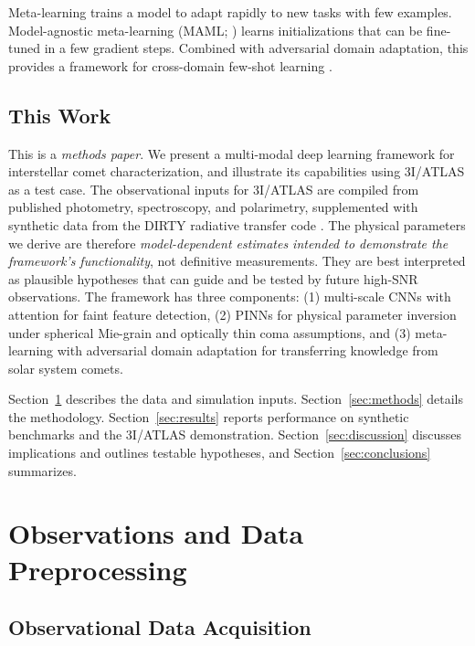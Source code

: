 \documentclass[preprint2]{aastex631}
\begin{document}
Meta-learning trains a model to adapt rapidly to new tasks with few examples. Model-agnostic meta-learning (MAML; \citealt{finn17}) learns initializations that can be fine-tuned in a few gradient steps. Combined with adversarial domain adaptation, this provides a framework for cross-domain few-shot learning \citep{li18}.

\subsection{This Work}

This is a \textit{methods paper}. We present a multi-modal deep learning framework for interstellar comet characterization, and illustrate its capabilities using 3I/ATLAS as a test case. The observational inputs for 3I/ATLAS are compiled from published photometry, spectroscopy, and polarimetry, supplemented with synthetic data from the DIRTY radiative transfer code \citep{gordon01}. The physical parameters we derive are therefore \textit{model-dependent estimates intended to demonstrate the framework's functionality}, not definitive measurements. They are best interpreted as plausible hypotheses that can guide and be tested by future high-SNR observations. The framework has three components: (1) multi-scale CNNs with attention for faint feature detection, (2) PINNs for physical parameter inversion under spherical Mie-grain and optically thin coma assumptions, and (3) meta-learning with adversarial domain adaptation for transferring knowledge from solar system comets.

Section~\ref{sec:obs} describes the data and simulation inputs. Section~\ref{sec:methods} details the methodology. Section~\ref{sec:results} reports performance on synthetic benchmarks and the 3I/ATLAS demonstration. Section~\ref{sec:discussion} discusses implications and outlines testable hypotheses, and Section~\ref{sec:conclusions} summarizes.

\section{Observations and Data Preprocessing}\label{sec:obs}

\subsection{Observational Data Acquisition}
\end{document}
